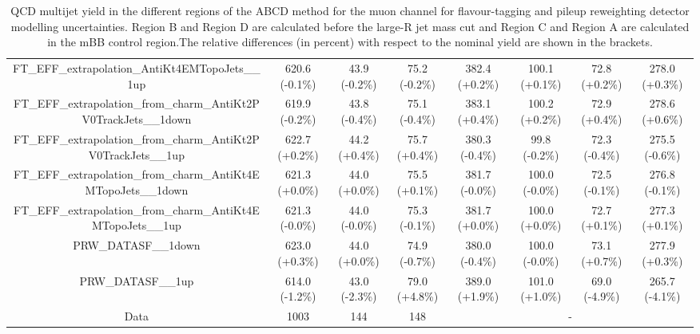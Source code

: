 \begin{table}[htbp!]
\begin{tiny}
\begin{center}
\begin{tabular}{c|c|c|c||c|c|c|c}
FT\_EFF\_extrapolation\_AntiKt4EMTopoJets\_\_1up             & 620.6     (-0.1\%) & 43.9      (-0.2\%) & 75.2      (-0.2\%) & 382.4     (+0.2\%) & 100.1     (+0.1\%) & 72.8      (+0.2\%) & 278.0     (+0.3\%) \\ 
FT\_EFF\_extrapolation\_from\_charm\_AntiKt2PV0TrackJets\_\_1down & 619.9     (-0.2\%) & 43.8      (-0.4\%) & 75.1      (-0.4\%) & 383.1     (+0.4\%) & 100.2     (+0.2\%) & 72.9      (+0.4\%) & 278.6     (+0.6\%) \\ 
FT\_EFF\_extrapolation\_from\_charm\_AntiKt2PV0TrackJets\_\_1up   & 622.7     (+0.2\%) & 44.2      (+0.4\%) & 75.7      (+0.4\%) & 380.3     (-0.4\%) & 99.8      (-0.2\%) & 72.3      (-0.4\%) & 275.5     (-0.6\%) \\ 
FT\_EFF\_extrapolation\_from\_charm\_AntiKt4EMTopoJets\_\_1down   & 621.3     (+0.0\%) & 44.0      (+0.0\%) & 75.5      (+0.1\%) & 381.7     (-0.0\%) & 100.0     (-0.0\%) & 72.5      (-0.1\%) & 276.8     (-0.1\%) \\ 
FT\_EFF\_extrapolation\_from\_charm\_AntiKt4EMTopoJets\_\_1up     & 621.3     (-0.0\%) & 44.0      (-0.0\%) & 75.3      (-0.1\%) & 381.7     (+0.0\%) & 100.0     (+0.0\%) & 72.7      (+0.1\%) & 277.3     (+0.1\%) \\ 
PRW\_DATASF\_\_1down                                         & 623.0     (+0.3\%) & 44.0      (+0.0\%) & 74.9      (-0.7\%) & 380.0     (-0.4\%) & 100.0     (-0.0\%) & 73.1      (+0.7\%) & 277.9     (+0.3\%) \\ 
PRW\_DATASF\_\_1up                                           & 614.0     (-1.2\%) & 43.0      (-2.3\%) & 79.0      (+4.8\%) & 389.0     (+1.9\%) & 101.0     (+1.0\%) & 69.0      (-4.9\%) & 265.7     (-4.1\%) \\ 
\hline 
\hline 
Data                                                        & 1003  & 144   & 148  &\multicolumn{4}{c}{-} \\ 
\hline
\end{tabular}
\end{center}
\caption{QCD multijet yield in the different regions of the ABCD method for the muon channel for flavour-tagging and pileup reweighting 
detector modelling uncertainties. Region B and Region D are calculated before the large-R jet mass cut and Region C and Region A are 
calculated in the mBB control region.The relative differences (in percent) with respect to the nominal yield are shown in the brackets.}
\label{tab:boosted_qcd_detsyst_elec_mbbcr_2}
\end{tiny}
\end{table}

